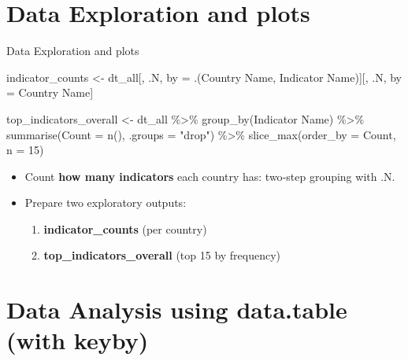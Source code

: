 \documentclass[
  8pt,
  ignorenonframetext,
]{beamer}
\newenvironment{Shaded}{\begin{snugshade}}{\end{snugshade}}
\newcommand{\AttributeTok}[1]{\textcolor[rgb]{0.40,0.45,0.13}{#1}}
\newcommand{\DecValTok}[1]{\textcolor[rgb]{0.68,0.00,0.00}{#1}}
\newcommand{\FunctionTok}[1]{\textcolor[rgb]{0.28,0.35,0.67}{#1}}
\newcommand{\NormalTok}[1]{\textcolor[rgb]{0.00,0.23,0.31}{#1}}
\newcommand{\OtherTok}[1]{\textcolor[rgb]{0.00,0.23,0.31}{#1}}
\newcommand{\SpecialCharTok}[1]{\textcolor[rgb]{0.37,0.37,0.37}{#1}}
\newcommand{\StringTok}[1]{\textcolor[rgb]{0.13,0.47,0.30}{#1}}
\begin{document}
\section{Data Exploration and plots}\label{data-exploration-and-plots}

\begin{frame}[fragile]{Data Exploration and plots}
\begin{Shaded}
\begin{Highlighting}[]
\NormalTok{indicator\_counts }\OtherTok{\textless{}{-}}\NormalTok{ dt\_all[, .N, by }\OtherTok{=}\NormalTok{ .(}\StringTok{\textasciigrave{}}\AttributeTok{Country Name}\StringTok{\textasciigrave{}}\NormalTok{, }\StringTok{\textasciigrave{}}\AttributeTok{Indicator Name}\StringTok{\textasciigrave{}}\NormalTok{)][, .N, by }\OtherTok{=} \StringTok{\textasciigrave{}}\AttributeTok{Country Name}\StringTok{\textasciigrave{}}\NormalTok{]}

\NormalTok{top\_indicators\_overall }\OtherTok{\textless{}{-}}\NormalTok{ dt\_all }\SpecialCharTok{\%\textgreater{}\%}
  \FunctionTok{group\_by}\NormalTok{(}\StringTok{\textasciigrave{}}\AttributeTok{Indicator Name}\StringTok{\textasciigrave{}}\NormalTok{) }\SpecialCharTok{\%\textgreater{}\%}
  \FunctionTok{summarise}\NormalTok{(}\AttributeTok{Count =} \FunctionTok{n}\NormalTok{(), }\AttributeTok{.groups =} \StringTok{"drop"}\NormalTok{) }\SpecialCharTok{\%\textgreater{}\%}
  \FunctionTok{slice\_max}\NormalTok{(}\AttributeTok{order\_by =}\NormalTok{ Count, }\AttributeTok{n =} \DecValTok{15}\NormalTok{)}
\end{Highlighting}
\end{Shaded}

\begin{itemize}
\item
  Count \textbf{how many indicators} each country has: two‐step grouping
  with .N.
\item
  Prepare two exploratory outputs:

  \begin{enumerate}
  \item
    \textbf{indicator\_counts} (per country)
  \item
    \textbf{top\_indicators\_overall} (top 15 by frequency)
  \end{enumerate}
\end{itemize}
\end{frame}

\section{Data Analysis using data.table (with
keyby)}\label{data-analysis-using-data.table-with-keyby}
\end{document}

